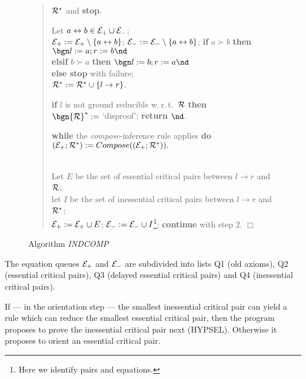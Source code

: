 \begin{figure}[ht]
\begin{center}
{\begin{minipage}{5.6in}
\begin{quote}
\begin{description}
      ${\cal R}^*$ and {\bf stop}.
 \item[{(5) [Orient.]}] Let
       \( a \leftrightarrow b \in {\cal E}_+ \cup {\cal E}_- \); \\
      \( {\cal E}_+ := {\cal E}_+ \setminus \{ a \leftrightarrow b \} \);
      \( {\cal E}_- := {\cal E}_- \setminus \{ a \leftrightarrow b \} \);
      {\bf if} \( a \succ b \) {\bf then} \(  \bgn l := a; r  := b \nd \) \\
      {\bf elsif} \( b \succ a \) {\bf then} \(  \bgn l := b; r  := a \nd \) \\
      {\bf else stop} with failure; \\
      \( {\cal R}^* := {\cal R}^* \cup \{ l \rightarrow r \} \).
 \item[{(6) [Consistency check.]}] {\bf if} $l$ is not ground reducible
  w.\,r.\,t.\ $\cal R$ {\bf then} \\
     \( \bgn {\cal R}^* := \) `disproof'; {\bf return} $\nd$.
 \item[{(7) [Compose.]}] {\bf while} the {\em compose}-inference rule
   applies {\bf do} \\
   \( ({\cal E_+};{\cal R}^*) := Compose(({\cal E}_+;{\cal R}^*)). \)
 \item[{(8) [Deduce.]}] \null \\
   Let $E$ be the set of essential critical pairs
   between $l \rightarrow r$ and $\cal R$;  \\
   let $I$ be the set of inessential critical pairs
   between $l \rightarrow r$ and ${\cal R}^*$; \\
   \( {\cal E}_+ := {\cal E}_+ \cup E \);
   \( {\cal E}_- := {\cal E}_- \cup I \)\footnote{Here we
                                             identify pairs and equations.};
    {\bf continue} with step 2. \hfill $\Box$
\end{description}
\end{quote}
\end{minipage}
}  
\end{center}
\caption{Algorithm {\em INDCOMP}} \label{fi:INDCOMP}
\end{figure}
 
The equation queues ${\cal E}_+$ and ${\cal E}_-$ are subdivided into lists
Q1 (old axioms), Q2 (essential critical pairs), Q3 (delayed essential
critical pairs) and Q4 (inessential critical pairs).

If --- in the orientation step --- the smallest inessential critical pair can 
yield a rule which can reduce the smallest essential critical pair, then the
program proposes to prove the inessential critical pair next (HYPSEL).
Otherwise it proposes to orient an essential critical pair.

